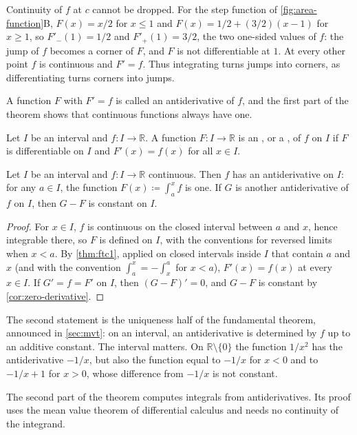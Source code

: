 Continuity of $f$ at $c$ cannot be dropped. For the step function of \cref{fig:area-function}B, $F(x)=x/2$ for $x\le1$ and $F(x)=1/2+(3/2)(x-1)$ for $x\ge1$, so $F'_-(1)=1/2$ and $F'_+(1)=3/2$, the two one-sided values of $f$: the jump of $f$ becomes a corner of $F$, and $F$ is not differentiable at $1$. At every other point $f$ is continuous and $F'=f$. Thus integrating turns jumps into corners, as differentiating turns corners into jumps.

A function $F$ with $F'=f$ is called an antiderivative of $f$, and the first part of the theorem shows that continuous functions always have one.

\begin{definition}[Antiderivative]
\label{def:antiderivative}
Let $I$ be an interval and $f\colon I\to\mathbb R$. A function $F\colon I\to\mathbb R$ is an , or a , of $f$ on $I$ if $F$ is differentiable on $I$ and $F'(x)=f(x)$ for all $x\in I$.
\end{definition}

\begin{corollary}
\label{cor:antiderivative}
Let $I$ be an interval and $f\colon I\to\mathbb R$ continuous. Then $f$ has an antiderivative on $I$: for any $a\in I$, the function $F(x)\coloneqq\int_a^xf$ is one. If $G$ is another antiderivative of $f$ on $I$, then $G-F$ is constant on $I$.
\end{corollary}

\begin{proof}
For $x\in I$, $f$ is continuous on the closed interval between $a$ and $x$, hence integrable there, so $F$ is defined on $I$, with the conventions for reversed limits when $x<a$. By \cref{thm:ftc1}, applied on closed intervals inside $I$ that contain $a$ and $x$ (and with the convention $\int_a^x=-\int_x^a$ for $x<a$), $F'(x)=f(x)$ at every $x\in I$. If $G'=f=F'$ on $I$, then $(G-F)'=0$, and $G-F$ is constant by \cref{cor:zero-derivative}.
\end{proof}

The second statement is the uniqueness half of the fundamental theorem, announced in \cref{sec:mvt}: on an interval, an antiderivative is determined by $f$ up to an additive constant. The interval matters. On $\mathbb R\setminus\{0\}$ the function $1/x^2$ has the antiderivative $-1/x$, but also the function equal to $-1/x$ for $x<0$ and to $-1/x+1$ for $x>0$, whose difference from $-1/x$ is not constant.

The second part of the theorem computes integrals from antiderivatives. Its proof uses the mean value theorem of differential calculus and needs no continuity of the integrand.

